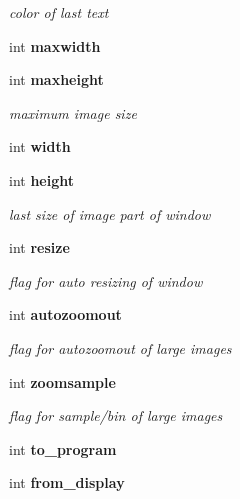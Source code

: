 \begin{CompactItemize}
\begin{CompactList}\small\item\em color of last text \item\end{CompactList}\item 
int {\bf maxwidth}\label{xtvutils_8c_a62}

\item 
int {\bf maxheight}\label{xtvutils_8c_a63}

\begin{CompactList}\small\item\em maximum image size \item\end{CompactList}\item 
int {\bf width}\label{xtvutils_8c_a64}

\item 
int {\bf height}\label{xtvutils_8c_a65}

\begin{CompactList}\small\item\em last size of image part of window \item\end{CompactList}\item 
int {\bf resize}\label{xtvutils_8c_a66}

\begin{CompactList}\small\item\em flag for auto resizing of window \item\end{CompactList}\item 
int {\bf autozoomout}\label{xtvutils_8c_a67}

\begin{CompactList}\small\item\em flag for autozoomout of large images \item\end{CompactList}\item 
int {\bf zoomsample}\label{xtvutils_8c_a68}

\begin{CompactList}\small\item\em flag for sample/bin of large images \item\end{CompactList}\item 
int {\bf to\_\-program}\label{xtvutils_8c_a69}

\item 
int {\bf from\_\-display}\label{xtvutils_8c_a70}


\end{CompactItemize}
